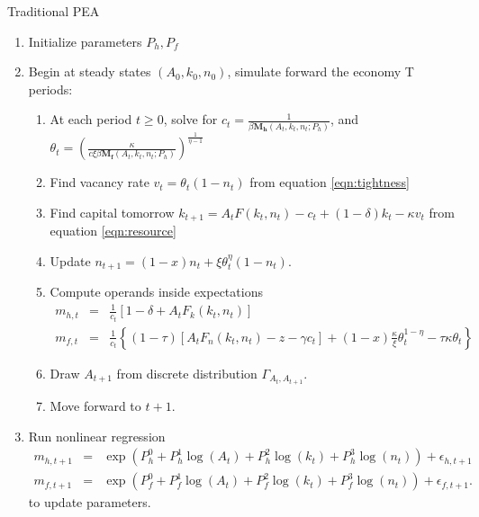 \documentclass[12pt]{article}
\begin{document}
\begin{algorithm}
	\caption{Traditional PEA}
	\label{alg:PEA}
	\begin{enumerate}
		\item Initialize parameters $P_{h},P_{f}$
		\item Begin at steady states $(A_0,k_0,n_0)$, simulate forward the economy T periods:
			\begin{enumerate}
				\item At each period $t \geq 0$, solve for $c_t=\frac{1}{\beta \mathbf{M_{h}}(A_t,k_t,n_t;P_{h})}$, and $\theta_t = (\frac{\kappa}{c \xi \beta \mathbf{M_{f}}(A_t,k_t,n_t;P_{h})})^{\frac{1}{\eta-1} }$
				\item Find vacancy rate $v_t=\theta_t (1-n_t)$ from equation \ref{eqn:tightness}
				\item Find capital tomorrow $k_{t+1}=A_t F(k_t,n_t)-c_t+(1-\delta)k_t-\kappa v_t$ from equation \ref{eqn:resource}
				\item Update $n_{t+1} = (1-x)n_t + \xi \theta_{t}^{\eta}(1-n_t)$.
				\item Compute operands inside expectations
					\begin{eqnarray}
						m_{h,t} &=& \frac{1}{c_t} \left[  1-\delta + A_t F_{k}(k_t,n_t) \right] \\
						m_{f,t} &=& \frac{1}{c_t} \left\{  (1-\tau) \left[ A_t F_{n}(k_t,n_t)-z-\gamma c_t \right]+(1-x)\frac{\kappa}{\xi}\theta_t^{1-\eta}-\tau \kappa \theta_t \right\} 
					\end{eqnarray}
				\item Draw $A_{t+1}$ from discrete distribution $\Gamma_{A_t,A_{t+1}}$.
				\item Move forward to $t+1$.
			\end{enumerate}
		\item Run nonlinear regression 
			\begin{eqnarray}
				m_{h,t+1} &=& \exp( P_{h}^0 + P_{h}^1 \log(A_t) + P_{h}^2 \log(k_t) + P_{h}^3 \log(n_t)) + \epsilon_{h,t+1}\\
				m_{f,t+1} &=& \exp( P_{f}^0 + P_{f}^1 \log(A_t) + P_{f}^2 \log(k_t) + P_{f}^3 \log(n_t)) + \epsilon_{f,t+1}.
			\end{eqnarray}
			to update parameters.
	\end{enumerate}
\end{algorithm}

	
% 	

  
\end{document}
